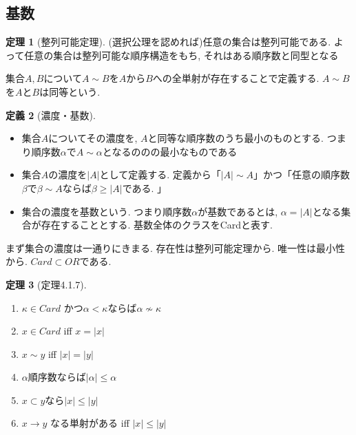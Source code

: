 \documentclass[dvipdfmx,a4paper,11pt]{article}
\theoremstyle{definition}
\newtheorem{thm}{定理}
\newtheorem{dfn}[thm]{定義}
\begin{document}
\subsection{基数}

 \begin{tcolorbox}
 [colback = white, colframe = green!35!black, fonttitle = \bfseries,breakable = true]
\begin{thm}[整列可能定理]
(選択公理を認めれば)任意の集合は整列可能である. 
よって任意の集合は整列可能な順序構造をもち, それはある順序数と同型となる
\end{thm}
\end{tcolorbox}

集合$A,B$について$A\sim B$を$A$から$B$への全単射が存在することで定義する. 
$A\sim B$を$A$と$B$は同等という.

 \begin{tcolorbox}
 [colback = white, colframe = green!35!black, fonttitle = \bfseries,breakable = true]
\begin{dfn}[濃度・基数]
\begin{itemize}
\item 集合$A$についてその濃度を, $A$と同等な順序数のうち最小のものとする. つまり順序数$\alpha$で$A \sim \alpha$となるののの最小なものである
\item 集合$A$の濃度を$|A|$として定義する. 定義から「$|A| \sim A$」かつ「任意の順序数$\beta$で$\beta \sim A$ならば$\beta \ge |A|$である. 」
\item 集合の濃度を基数という. つまり順序数$\alpha$が基数であるとは, $\alpha = |A|$となる集合が存在することとする. 基数全体のクラスをCardと表す.
\end{itemize}
\end{dfn}
\end{tcolorbox}

まず集合の濃度は一通りにきまる. 存在性は整列可能定理から. 唯一性は最小性から. $Card \subset OR$である. 

 \begin{tcolorbox}
 [colback = white, colframe = green!35!black, fonttitle = \bfseries,breakable = true]
\begin{thm}[定理4.1.7]
\begin{enumerate}
\item $\kappa \in Card$ かつ$\alpha < \kappa$ならば$\alpha \not \sim \kappa$
\item $x \in Card$ iff $x = |x|$
\item $x \sim y$ iff $|x| = |y|$
\item $\alpha$順序数ならば$|\alpha| \le \alpha$
\item $x \subset y$なら$|x| \le |y|$
\item $x \to y$ なる単射がある iff $|x| \le |y|$
\end{enumerate}
\end{thm}
\end{tcolorbox}
\end{document}
